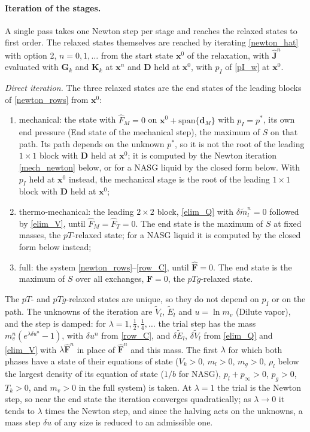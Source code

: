 \paragraph{Iteration of the stages.}
A single pass takes one Newton step per stage and reaches the relaxed states to first order. The relaxed states themselves are reached by iterating \eqref{newton_hat} with option 2, $n=0,1,\dots$ from the start state $\boldsymbol{x}^0$ of the relaxation, with $\hat{\boldsymbol{J}}^n$ evaluated with $\boldsymbol{G}_k$ and $\boldsymbol{K}_k$ at $\boldsymbol{x}^n$ and $\boldsymbol{D}$ held at $\boldsymbol{x}^0$, with $p_I$ of \eqref{pI_w} at $\boldsymbol{x}^0$.

\emph{Direct iteration.} The three relaxed states are the end states of the leading blocks of \eqref{newton_rows} from $\boldsymbol{x}^0$:
\begin{enumerate}
\item mechanical: the state with $\hat{F}_M=0$ on $\boldsymbol{x}^0+\mathrm{span}\{\boldsymbol{d}_M\}$ with $p_I=p^*$, its own end pressure (End state of the mechanical step), the maximum of $S$ on that path. Its path depends on the unknown $p^*$, so it is not the root of the leading $1\times1$ block with $\boldsymbol{D}$ held at $\boldsymbol{x}^0$; it is computed by the Newton iteration \eqref{mech_newton} below, or for a NASG liquid by the closed form below. With $p_I$ held at $\boldsymbol{x}^0$ instead, the mechanical stage is the root of the leading $1\times1$ block with $\boldsymbol{D}$ held at $\boldsymbol{x}^0$;
\item thermo-mechanical: the leading $2\times2$ block, \eqref{elim_Q} with $\delta\tilde{m}_l^n=0$ followed by \eqref{elim_V}, until $\hat{F}_M=\hat{F}_T=0$. The end state is the maximum of $S$ at fixed masses, the $pT$-relaxed state; for a NASG liquid it is computed by the closed form below instead;
\item full: the system \eqref{newton_rows}--\eqref{row_C}, until $\hat{\boldsymbol{F}}=0$. The end state is the maximum of $S$ over all exchanges, $\boldsymbol{F}=0$, the $pTg$-relaxed state.
\end{enumerate}
The $pT$- and $pTg$-relaxed states are unique, so they do not depend on $p_I$ or on the path. The unknowns of the iteration are $\tilde{V}_l$, $\tilde{E}_l$ and $u=\ln m_v$ (Dilute vapor), and the step is damped: for $\lambda=1,\frac12,\frac14,\dots$ the trial step has the mass $m_v^n(e^{\lambda\delta u^n}-1)$, with $\delta u^n$ from \eqref{row_C}, and $\delta\tilde{E}_l$, $\delta\tilde{V}_l$ from \eqref{elim_Q} and \eqref{elim_V} with $\lambda\hat{\boldsymbol{F}}^n$ in place of $\hat{\boldsymbol{F}}^n$ and this mass. The first $\lambda$ for which both phases have a state of their equations of state ($V_k>0$, $m_l>0$, $m_g>0$, $\rho_l$ below the largest density of its equation of state ($1/b$ for NASG), $p_l+p_\infty>0$, $p_g>0$, $T_k>0$, and $m_v>0$ in the full system) is taken. At $\lambda=1$ the trial is the Newton step, so near the end state the iteration converges quadratically; as $\lambda\to0$ it tends to $\lambda$ times the Newton step, and since the halving acts on the unknowns, a mass step $\delta u$ of any size is reduced to an admissible one.

